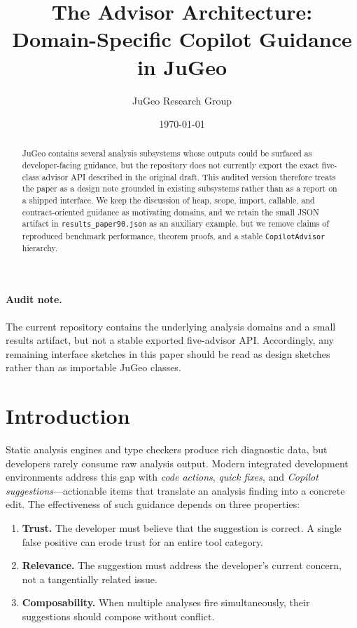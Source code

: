 \documentclass[11pt]{article}
\title{\textbf{The Advisor Architecture:\\
Domain-Specific Copilot Guidance in JuGeo}}
\author{%
  JuGeo Research Group
}
\date{\today}
\begin{document}
\maketitle

\paragraph{Audit note.}
The current repository contains the underlying analysis domains and a
small results artifact, but not a stable exported five-advisor API.
Accordingly, any remaining interface sketches in this paper should be
read as design sketches rather than as importable JuGeo classes.

\begin{abstract}
JuGeo contains several analysis subsystems whose outputs could be
surfaced as developer-facing guidance, but the repository does not
currently export the exact five-class advisor API described in the
original draft.  This audited version therefore treats the paper as a
design note grounded in existing subsystems rather than as a report on a
shipped interface.  We keep the discussion of heap, scope, import,
callable, and contract-oriented guidance as motivating domains, and we
retain the small JSON artifact in \texttt{results\_paper90.json} as an
auxiliary example, but we remove claims of reproduced benchmark
performance, theorem proofs, and a stable \texttt{CopilotAdvisor}
hierarchy.
\end{abstract}

\section{Introduction}\label{sec:intro}

Static analysis engines and type checkers produce rich diagnostic data,
but developers rarely consume raw analysis output.  Modern integrated
development environments address this gap with \emph{code actions},
\emph{quick fixes}, and \emph{Copilot suggestions}—actionable items
that translate an analysis finding into a concrete edit.  The
effectiveness of such guidance depends on three properties:

\begin{enumerate}
  \item \textbf{Trust.}  The developer must believe that the suggestion
    is correct.  A single false positive can erode trust for an entire
    tool category.
  \item \textbf{Relevance.}  The suggestion must address the developer's
    current concern, not a tangentially related issue.
  \item \textbf{Composability.}  When multiple analyses fire
    simultaneously, their suggestions should compose without conflict.
\end{enumerate}
\end{document}
